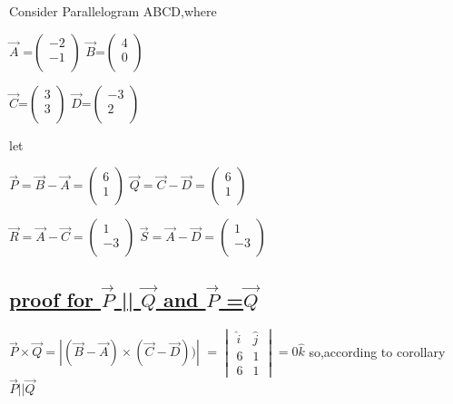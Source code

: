 \documentclass[journal,12pt,twocolumn]{IEEEtran}
\begin{document}
Consider  Parallelogram ABCD,where

$ \vec{A}$ =$\begin{pmatrix}-2 \\ -1 \\ \end{pmatrix}$ \hspace{0.3cm} $ \vec{B} $=$\begin{pmatrix} 4\\ 0 \\ \end{pmatrix}$ 

$ \vec{C} $=$\begin{pmatrix}3 \\ 3 \\ \end{pmatrix}$ \hspace{0.3cm} $ \vec{D} $=$\begin{pmatrix}-3 \\ 2 \\ \end{pmatrix}$ 
\vspace{0.2cm}


let

$ \vec{P} =\vec{B}-\vec{A}=\begin{pmatrix}6 \\ 1 \\ \end{pmatrix}$ \hspace{0.3cm}$ \vec{Q}= \vec{C}-\vec{D}=\begin{pmatrix}6 \\ 1 \\ \end{pmatrix}$ 

$ \vec{R} = \vec{A}-\vec{C}=\begin{pmatrix}1 \\ -3 \\ \end{pmatrix}$ \hspace{0.3cm}$ \vec{S}= \vec{A}-\vec{D}=\begin{pmatrix}1 \\ -3 \\ \end{pmatrix}$ 

\subsection{\underline{proof for  \textbf{$\vec{P}$} || \textbf{$\vec{Q}$} and \textbf{$\vec{P}$} =\textbf{$\vec{Q}$}}}
\boldmath
$ \vec{P}\times \vec{Q}=|(\vec{B}-\vec{A})\times (\vec{C}-\vec{D}))|$
$ = \begin{vmatrix}
           \hat{i} & \hat{j}\\
            6 & 1\\
            6 & 1
    \end{vmatrix} = {0\hat{k}}  $
\unboldmath  
\vspace{0.2cm}
so,according to corollary $\vec{P} || \vec{Q}$
\end{document}
